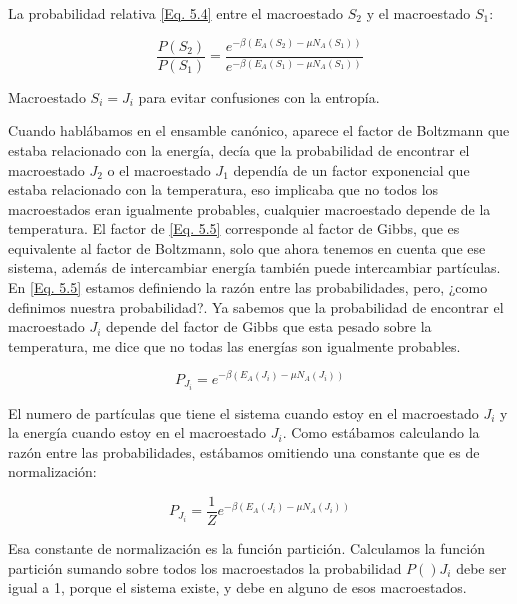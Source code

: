\documentclass[11pt,fleqn]{book}
\begin{document}
La probabilidad relativa \ref{Eq. 5.4} entre el macroestado $S_{2}$ y el macroestado $S_{{1}}$:

\begin{equation}
    \frac{P(S_{2})}{P(S_{1})}=\frac{e^{-\beta(E_{A}(S_{2})-\mu N_{A}(S_{1}))}}{e^{-\beta(E_{A}(S_{1})-\mu N_{A}(S_{1}))}}
    \label{Eq. 5.5}
\end{equation}


\begin{remark}
    Macroestado $S_{i}=J_{i}$ para evitar confusiones con la entropía.
\end{remark}

Cuando hablábamos en el ensamble canónico, aparece el factor de Boltzmann que estaba relacionado con la energía, decía que la probabilidad de encontrar el macroestado $J_{2}$ o el macroestado $J_{1}$ dependía de un factor exponencial que estaba relacionado con la temperatura, eso implicaba que no todos los macroestados eran igualmente probables, cualquier macroestado depende de la temperatura. El factor de \ref{Eq. 5.5} corresponde al factor de Gibbs, que es equivalente al factor de Boltzmann, solo que ahora tenemos en cuenta que ese sistema, además de intercambiar energía también puede intercambiar partículas. En \ref{Eq. 5.5} estamos definiendo la  razón entre las probabilidades, pero, ¿como definimos nuestra probabilidad?. Ya sabemos que la probabilidad de encontrar el macroestado $J_{i}$ depende del factor de Gibbs que esta pesado sobre la temperatura, me dice que no todas las energías son igualmente probables.

\begin{equation*}
    P_{J_{i}}=e^{-\beta(E_{A}(J_{i})-\mu N_{A}(J_{i}))}
\end{equation*}

El numero de partículas que tiene el sistema cuando estoy en el macroestado $J_{i}$ y la energía cuando estoy en el macroestado $J_{i}$. Como estábamos calculando la  razón entre las probabilidades, estábamos omitiendo una constante que es de normalización:

\begin{equation}
    P_{J_{i}}=\frac{1}{Z}e^{-\beta(E_{A}(J_{i})-\mu N_{A}(J_{i}))}
    \label{Eq. 5.6}
\end{equation}

Esa constante de normalización es la función partición. Calculamos la función partición sumando sobre todos los macroestados la probabilidad $P()J_{i}$ debe ser igual a 1, porque el sistema existe, y debe en alguno de esos macroestados.  
\end{document}
